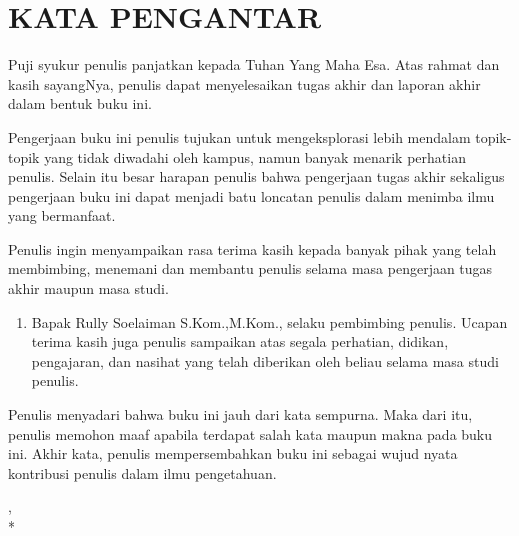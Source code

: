 \chapter {KATA PENGANTAR}

Puji syukur penulis panjatkan kepada Tuhan Yang Maha Esa. Atas rahmat dan kasih sayangNya, penulis dapat menyelesaikan tugas akhir dan laporan akhir dalam bentuk buku ini.

Pengerjaan buku ini penulis tujukan untuk mengeksplorasi lebih mendalam topik-topik yang tidak diwadahi oleh kampus, namun banyak menarik perhatian penulis. Selain itu besar harapan penulis bahwa pengerjaan tugas akhir sekaligus pengerjaan buku ini dapat menjadi batu loncatan penulis dalam menimba ilmu yang bermanfaat.

Penulis ingin menyampaikan rasa terima kasih kepada banyak pihak yang telah membimbing, menemani dan membantu penulis selama masa pengerjaan tugas akhir maupun masa studi.

\begin {enumerate}
	\item Bapak Rully Soelaiman S.Kom.,M.Kom., selaku pembimbing penulis. Ucapan terima kasih juga penulis sampaikan atas segala perhatian, didikan, pengajaran, dan nasihat yang telah diberikan oleh beliau selama masa studi penulis.
\end {enumerate}

Penulis menyadari bahwa buku ini jauh dari kata sempurna. Maka dari itu, penulis memohon maaf apabila terdapat salah kata maupun makna pada buku ini. Akhir kata, penulis mempersembahkan buku ini sebagai wujud nyata kontribusi penulis dalam ilmu pengetahuan.

\begin{flushright}
\lokasi, \tanggal \\*
\vspace{5em}
\penulis
\end{flushright}